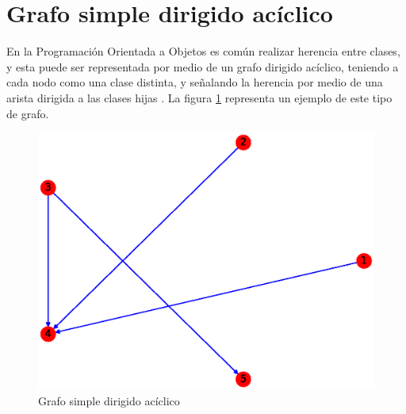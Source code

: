 \documentclass{article}
\begin{document}
\section{Grafo simple dirigido acíclico}
En la Programación Orientada a Objetos es común realizar herencia entre clases, y esta puede ser representada por medio de un grafo dirigido acíclico, teniendo a cada nodo como una clase distinta, y señalando la herencia por medio de una arista dirigida a las clases hijas \cite{GSDA}. La figura \ref{fig:GSDA} representa un ejemplo de este tipo de grafo.
\begin{figure}[h!]
    \includegraphics[width=\textwidth]{4-GSDA}
    \caption{Grafo simple dirigido acíclico}
    \label{fig:GSDA}
\end{figure}



\end{document}
